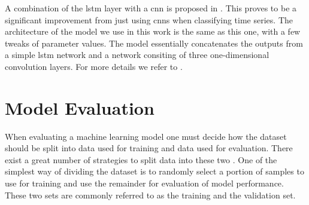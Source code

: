 A combination of the \gls{lstm} layer with a \gls{cnn} is proposed in \citep{karim_majumdar_darabi_chen_2018}. This proves to be a significant improvement from just using \gls{cnn}s when classifying time series. The architecture of the model we use in this work is the same as this one, with a few tweaks of parameter values. The model essentially concatenates the outputs from a simple \gls{lstm} network and a network consiting of three one-dimensional convolution layers. For more details we refer to \citep{karim_majumdar_darabi_chen_2018}.

\section{Model Evaluation}






When evaluating a machine learning model one must decide how the dataset should be split into data used for training and data used for evaluation. There exist a great number of strategies to split data into these two \citep{raschka}. One of the simplest way of dividing the dataset is to randomly select a portion of samples to use for training and use the remainder for evaluation of model performance. These two sets are commonly referred to as the training and the validation set.

